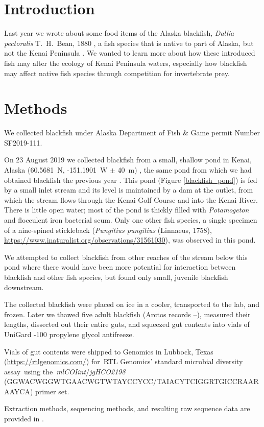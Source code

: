 \begin{multicols}{2}   

\section{Introduction}

Last year we  wrote about some food items of the Alaska blackfish, \textit{Dallia pectoralis} T.\ H.\ Bean, 1880 \citep{Bowseretal2019},  a fish species that is native to part of Alaska, but not the Kenai Peninsula \citep{Eidametal2016, Bowser2018}. We wanted to learn more about how these introduced fish may alter the ecology of Kenai Peninsula waters, especially how blackfish may affect native fish species through competition for invertebrate prey.

\section{Methods}

We collected blackfish under Alaska Department of Fish \& Game permit Number SF2019-111.

On 23 August 2019 we collected blackfish from a small, shallow pond in Kenai, Alaska (60.5681~\textdegree{}N, -151.1901~\textdegree{}W $\pm$ 40~m) \citep{bowser2019}, the same pond from which we had obtained blackfish the previous year \citep{Bowseretal2019}. This pond (Figure \ref{blackfish_pond}) is fed by a small inlet stream and its level is maintained by a dam at the outlet, from which the stream flows through the Kenai Golf Course and into the Kenai River. There is little open water; most of the pond is thickly filled with \textit{Potamogeton} and flocculent iron bacterial scum. Only one other fish species, a single specimen of a nine-spined stickleback (\textit{Pungitius pungitius} (Linnaeus, 1758),  
\url{https://www.inaturalist.org/observations/31561030}), was observed in this pond.

We attempted to collect blackfish from other reaches of the stream below this pond where there would have been more potential for interaction between blackfish and other fish species, but found only small, juvenile blackfish downstream. 

The collected blackfish were placed on ice in a cooler, transported to the lab, and frozen. Later we thawed five adult blackfish (Arctos records --), measured their lengths, dissected out their entire guts, and squeezed gut contents into vials of UniGard -100 propylene glycol antifreeze.

Vials of gut contents were shipped to  Genomics in Lubbock, Texas (\url{https://rtlgenomics.com/}) for RTL Genomics' standard microbial diversity assay using the \textit{mlCOIint}/\textit{jgHCO2198} (GGWACWGGWTGAACWGTWTAYCCYCC/TAIACYTCIGGRTGICCRAARAAYCA) primer set.

Extraction methods, sequencing methods, and resulting raw sequence data are provided in \citet{BowserBowser2020}.

\end{multicols}
